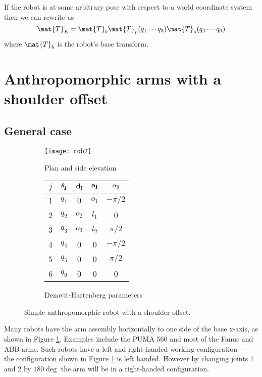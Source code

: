 \documentclass[11pt]{article}
\numberwithin{equation}{section}
\begin{document}
If the robot is at some arbitrary pose with respect to a world coordinate system then we can rewrite  as
\[
\mat{T}_E = \mat{T}_b \mat{T}_p(q_1 \cdots q_3) \mat{T}_o(q_4 \cdots q_6) 
\]
where $\mat{T}_b$ is the robot's base transform.

\pagebreak
\section{Anthropomorphic arms with a shoulder offset}
\subsection{General case}

	\begin{figure}[h]
	\centering
	\begin{subfigure}[b]{0.6\textwidth}
		\texttt{[image: rob2]}
		\caption{Plan and side elevation}
		\label{fig:rob2}
	\end{subfigure}
	\begin{subfigure}[b]{0.3\textwidth}
		\begin{tabular}{|c|c|c|c|c|} \hline
			$j$ & $\bf \theta_j$ & $\bf d_j$ & $\bf a_j$ & $\bf \alpha_j$ \\ \hline
			\rowcolor{SkyBlue}1 &  $q_1$ & \cellcolor{White} 0 &  $o_1$& $-\pi/2$ \\
			\rowcolor{SkyBlue}2 & $q_2$ & $o_2$ & $l_1$& 0 \\
			\rowcolor{SkyBlue}3 &  $q_3$ & $o_3$ &$l_2$  & $\pi/2$ \\
			\rowcolor{Peach}4 & $q_4$ & 0 & 0 & $-\pi/2$ \\
			\rowcolor{Peach}5 &  $q_5$ & 0 & 0 & $\pi/2$ \\
			\cellcolor{Peach} 6 & \cellcolor{Peach} $q_6$ & 0 &0  & 0 \\ \hline
		\end{tabular}
		\caption{Denavit-Hartenberg parameters}
		\label{fig:dh2}
	\end{subfigure}
	\caption{Simple anthropomorphic robot with a shoulder offset.}
	\end{figure}


Many robots have the arm assembly horizontally to one side of the base x-axis, as shown in Figure \ref{fig:rob2}.  
Examples include the PUMA 560 and most of
the Fanuc and ABB arms.
Such robots have a left and right-handed working configuration\cite[Sec~7.4.4]{Corke11a} --- the configuration shown in Figure \ref{fig:rob2} is left handed.  However by
changing joints 1 and 2 by $180\deg$ the arm will be in a right-handed configuration.
\end{document}

